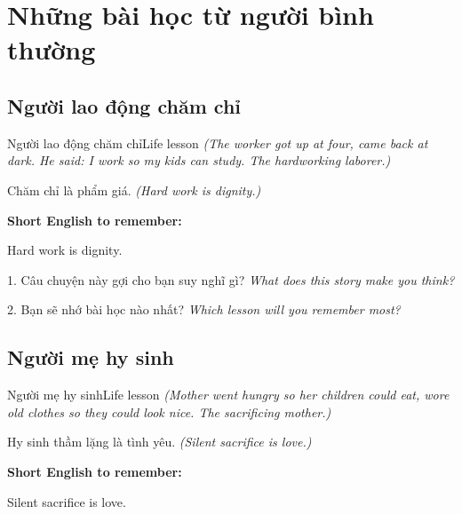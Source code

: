 \chapter{Những bài học từ người bình thường}


\section{Người lao động chăm chỉ}
\begin{truyen}{Người lao động chăm chỉ}{Life lesson}
\textit{(The worker got up at four, came back at dark. He said: I work so my kids can study. The hardworking laborer.)}
\end{truyen}

\begin{baihoc}
Chăm chỉ là phẩm giá.
\textit{(Hard work is dignity.)}
\end{baihoc}

\begin{ghinhoanh}
\textbf{Short English to remember:}

Hard work is dignity.

\end{ghinhoanh}

\begin{tuhocnhanh}
1. Câu chuyện này gợi cho bạn suy nghĩ gì? \textit{What does this story make you think?}

2. Bạn sẽ nhớ bài học nào nhất? \textit{Which lesson will you remember most?}
\end{tuhocnhanh}
\ngancach


\section{Người mẹ hy sinh}
\begin{truyen}{Người mẹ hy sinh}{Life lesson}
\textit{(Mother went hungry so her children could eat, wore old clothes so they could look nice. The sacrificing mother.)}
\end{truyen}

\begin{baihoc}
Hy sinh thầm lặng là tình yêu.
\textit{(Silent sacrifice is love.)}
\end{baihoc}

\begin{ghinhoanh}
\textbf{Short English to remember:}

Silent sacrifice is love.

\end{ghinhoanh}


